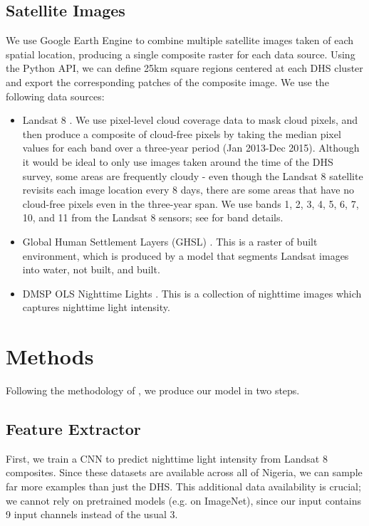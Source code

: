 \documentclass[]{article}
\begin{document}
\subsection{Satellite Images}
We use Google Earth Engine to combine multiple satellite images taken of each spatial location, producing a single composite raster for each data source. Using the Python API, we can define 25km square regions centered at each DHS cluster and export the corresponding patches of the composite image. We use the following data sources:
\begin{itemize}
\item Landsat 8 \cite{landsatSite}. We use pixel-level cloud coverage data to mask cloud pixels, and then produce a composite of cloud-free pixels by taking the median pixel values for each band over a three-year period (Jan 2013-Dec 2015). Although it would be ideal to only use images taken around the time of the DHS survey, some areas are frequently cloudy - even though the Landsat 8 satellite revisits each image location every 8 days, there are some areas that have no cloud-free pixels even in the three-year span. We use bands 1, 2, 3, 4, 5, 6, 7, 10, and 11 from the Landsat 8 sensors; see \cite{landsatSite} for band details.
\item Global Human Settlement Layers (GHSL) \cite{ghsl}. This is a raster of built environment, which is produced by a model that segments Landsat images into water, not built, and built.
\item DMSP OLS Nighttime Lights \cite{dmspols}. This is a collection of nighttime images which captures nighttime light intensity. 
\end{itemize}

\section{Methods}
Following the methodology of \cite{jean2016combining}, we produce our model in two steps. 

\subsection{Feature Extractor}
First, we train a CNN to predict nighttime light intensity from Landsat 8 composites. Since these datasets are available across all of Nigeria, we can sample far more examples than just the DHS. This additional data availability is crucial; we cannot rely on pretrained models (e.g. on ImageNet), since our input contains 9 input channels instead of the usual 3.
\end{document}

